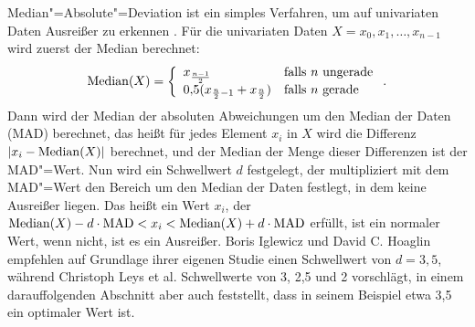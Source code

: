 Median"=Absolute"=Deviation ist ein simples Verfahren, um auf univariaten Daten Ausreißer zu erkennen \cite[Ch. 3.3]{mad}. Für die univariaten Daten $X=x_0,x_1,\ldots, x_{n-1}$ wird zuerst der Median berechnet: \[\operatorname{Median}(X)=\left\{ \begin{array}{ll}
    x_{\frac{n-1}{2}} & \text{falls } n \text{ ungerade} \\
    0{,}5 (x_{\frac{n}{2}-1} + x_{\frac{n}{2}}) & \text{falls } n \text{ gerade} \\
\end{array} \right..\]
Dann wird der Median der absoluten Abweichungen um den Median der Daten (MAD) berechnet, das heißt für jedes Element $x_i$ in $X$ wird die Differenz $|x_i - \operatorname{Median}(X)|$ berechnet, und der Median der Menge dieser Differenzen ist der MAD"=Wert. Nun wird ein Schwellwert $d$ festgelegt, der multipliziert mit dem MAD"=Wert den Bereich um den Median der Daten festlegt, in dem keine Ausreißer liegen. Das heißt ein Wert $x_i$, der $\operatorname{Median}(X) - d \cdot \text{MAD} < x_i < \operatorname{Median}(X) + d \cdot \text{MAD}$ erfüllt, ist ein normaler Wert, wenn nicht, ist es ein Ausreißer. Boris Iglewicz und David C. Hoaglin \cite[Ch. 3.3]{mad} empfehlen auf Grundlage ihrer eigenen Studie einen Schwellwert von $d=3{,}5$, während Christoph Leys et al. \cite[p. 766]{mad2} Schwellwerte von 3, 2,5 und 2 vorschlägt, in einem darauffolgenden Abschnitt aber auch feststellt, dass in seinem Beispiel etwa 3,5 ein optimaler Wert ist.
